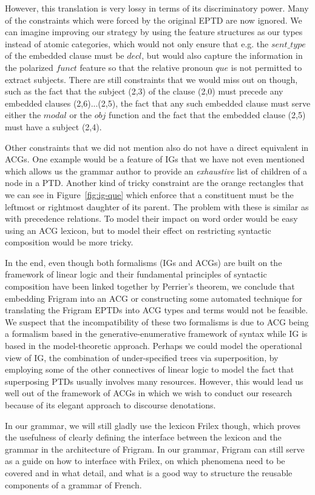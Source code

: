 However, this translation is very lossy in terms of its discriminatory
power. Many of the constraints which were forced by the original EPTD
are now ignored. We can imagine improving our strategy by using the
feature structures as our types instead of atomic categories, which
would not only ensure that e.g. the $sent\_type$ of the embedded clause
must be $decl$, but would also capture the information in the polarized
$funct$ feature so that the relative pronoun $que$ is not permitted to
extract subjects. There are still constraints that we would miss out on
though, such as the fact that the subject (2,3) of the clause (2,0) must
precede any embedded clauses (2,6)...(2,5), the fact that any such
embedded clause must serve either the $modal$ or the $obj$ function and
the fact that the embedded clause (2,5) must have a subject (2,4).

Other constraints that we did not mention also do not have a direct
equivalent in ACGs. One example would be a feature of IGs that we have
not even mentioned which allows us the grammar author to provide an
\emph{exhaustive} list of children of a node in a PTD. Another kind of
tricky constraint are the orange rectangles that we can see in
Figure~\ref{fig:ig-que} which enforce that a constituent must be the
leftmost or rightmost daughter of its parent. The problem with these is
similar as with precedence relations. To model their impact on word
order would be easy using an ACG lexicon, but to model their effect on
restricting syntactic composition would be more tricky.

In the end, even though both formalisms (IGs and ACGs) are built on the
framework of linear logic and their fundamental principles of syntactic
composition have been linked together by Perrier's theorem, we conclude
that embedding Frigram into an ACG or constructing some automated
technique for translating the Frigram EPTDs into ACG types and terms
would not be feasible. We suspect that the incompatibility of these two
formalisms is due to ACG being a formalism based in the
generative-enumerative framework of syntax while IG is based in the
model-theoretic approach. Perhaps we could model the operational view of
IG, the combination of under-specified trees via superposition, by
employing some of the other connectives of linear logic to model the
fact that superposing PTDs usually involves many resources. However,
this would lead us well out of the framework of ACGs in which we wish to
conduct our research because of its elegant approach to discourse
denotations.

In our grammar, we will still gladly use the lexicon Frilex though,
which proves the usefulness of clearly defining the interface between
the lexicon and the grammar in the architecture of Frigram. In our
grammar, Frigram can still serve as a guide on how to interface with
Frilex, on which phenomena need to be covered and in what detail, and
what is a good way to structure the reusable components of a grammar of
French.
